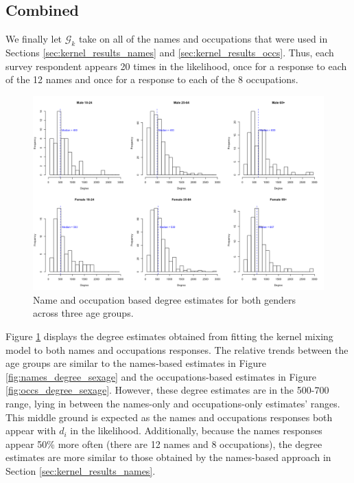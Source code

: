 \subsection{Combined}
\label{sec:kernel_results_comb}

We finally let $\mathcal{G}_k$ take on all of the names and occupations that were used in Sections \ref{sec:kernel_results_names} and \ref{sec:kernel_results_occs}. Thus, each survey respondent appears 20 times in the likelihood, once for a response to each of the 12 names and once for a response to each of the 8 occupations. 

\begin{figure}
\includegraphics[width=\textwidth]{figures/kernel/comb/deg_sexage.png}
\caption{Name and occupation based degree estimates for both genders across three age groups. }
\label{fig:comb_degree_sexage}
\end{figure}

Figure \ref{fig:comb_degree_sexage} displays the degree estimates obtained from fitting the kernel mixing model to both names and occupations responses. The relative trends between the age groups are similar to the names-based estimates in Figure \ref{fig:names_degree_sexage} and the occupations-based estimates in Figure \ref{fig:occs_degree_sexage}. However, these degree estimates are in the 500-700 range, lying in between the names-only and occupations-only estimates' ranges. This middle ground is expected as the names and occupations responses both appear with $d_i$ in the likelihood. Additionally, because the names responses appear 50\% more often (there are 12 names and 8 occupations), the degree estimates are more similar to those obtained by the names-based approach in Section \ref{sec:kernel_results_names}.


